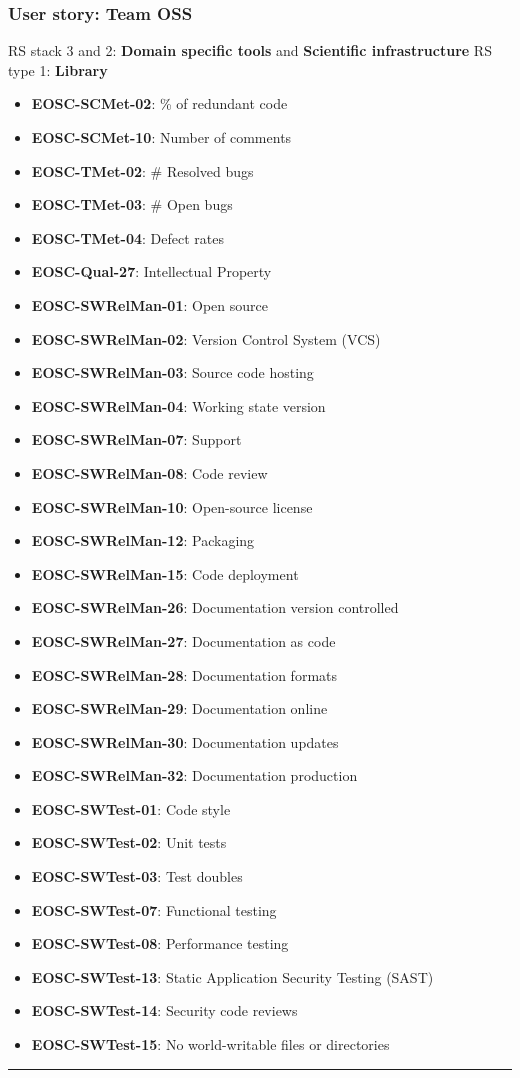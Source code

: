 \subsubsection{User story: Team OSS}

RS stack 3 and 2: \textbf{Domain specific tools} and  \textbf{Scientific infrastructure} \newline
RS type 1: \textbf{Library}

\begin{itemize}
    \item \textbf{EOSC-SCMet-02}: \% of redundant code
    \item \textbf{EOSC-SCMet-10}: Number of comments
    \item \textbf{EOSC-TMet-02}: \# Resolved bugs
    \item \textbf{EOSC-TMet-03}: \# Open bugs
    \item \textbf{EOSC-TMet-04}: Defect rates
    \item \textbf{EOSC-Qual-27}: Intellectual Property
    \item \textbf{EOSC-SWRelMan-01}: Open source
    \item \textbf{EOSC-SWRelMan-02}: Version Control System (VCS)
    \item \textbf{EOSC-SWRelMan-03}: Source code hosting
    \item \textbf{EOSC-SWRelMan-04}: Working state version
    \item \textbf{EOSC-SWRelMan-07}: Support
    \item \textbf{EOSC-SWRelMan-08}: Code review
    \item \textbf{EOSC-SWRelMan-10}: Open-source license
    \item \textbf{EOSC-SWRelMan-12}: Packaging
    \item \textbf{EOSC-SWRelMan-15}: Code deployment
    \item \textbf{EOSC-SWRelMan-26}: Documentation version controlled
    \item \textbf{EOSC-SWRelMan-27}: Documentation as code
    \item \textbf{EOSC-SWRelMan-28}: Documentation formats
    \item \textbf{EOSC-SWRelMan-29}: Documentation online
    \item \textbf{EOSC-SWRelMan-30}: Documentation updates
    \item \textbf{EOSC-SWRelMan-32}: Documentation production
    \item \textbf{EOSC-SWTest-01}: Code style
    \item \textbf{EOSC-SWTest-02}: Unit tests
    \item \textbf{EOSC-SWTest-03}: Test doubles
    \item \textbf{EOSC-SWTest-07}: Functional testing
    \item \textbf{EOSC-SWTest-08}: Performance testing
    \item \textbf{EOSC-SWTest-13}: Static Application Security Testing (SAST)
    \item \textbf{EOSC-SWTest-14}: Security code reviews
    \item \textbf{EOSC-SWTest-15}: No world-writable files or directories
\end{itemize}
\hrule

